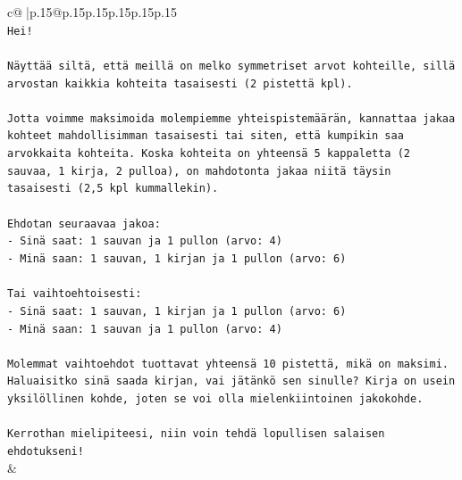 \documentclass{article}
\begin{document}
{\begin{supertabular}{c@{$\;$}|p{.15\linewidth}@{}p{.15\linewidth}p{.15\linewidth}p{.15\linewidth}p{.15\linewidth}p{.15\linewidth}}
{{{\\ 
\texttt{Hei!} \\
\\ 
\texttt{Näyttää siltä, että meillä on melko symmetriset arvot kohteille, sillä arvostan kaikkia kohteita tasaisesti (2 pistettä kpl).} \\
\\ 
\texttt{Jotta voimme maksimoida molempiemme yhteispistemäärän, kannattaa jakaa kohteet mahdollisimman tasaisesti tai siten, että kumpikin saa arvokkaita kohteita. Koska kohteita on yhteensä 5 kappaletta (2 sauvaa, 1 kirja, 2 pulloa), on mahdotonta jakaa niitä täysin tasaisesti (2,5 kpl kummallekin).} \\
\\ 
\texttt{Ehdotan seuraavaa jakoa:} \\
\texttt{{-} Sinä saat: 1 sauvan ja 1 pullon (arvo: 4)} \\
\texttt{{-} Minä saan: 1 sauvan, 1 kirjan ja 1 pullon (arvo: 6)} \\
\\ 
\texttt{Tai vaihtoehtoisesti:} \\
\texttt{{-} Sinä saat: 1 sauvan, 1 kirjan ja 1 pullon (arvo: 6)} \\
\texttt{{-} Minä saan: 1 sauvan ja 1 pullon (arvo: 4)} \\
\\ 
\texttt{Molemmat vaihtoehdot tuottavat yhteensä 10 pistettä, mikä on maksimi. Haluaisitko sinä saada kirjan, vai jätänkö sen sinulle? Kirja on usein yksilöllinen kohde, joten se voi olla mielenkiintoinen jakokohde.} \\
\\ 
\texttt{Kerrothan mielipiteesi, niin voin tehdä lopullisen salaisen ehdotukseni!} \\
            }
        }
    }
    & \\ \\


\end{supertabular}}
\end{document}
